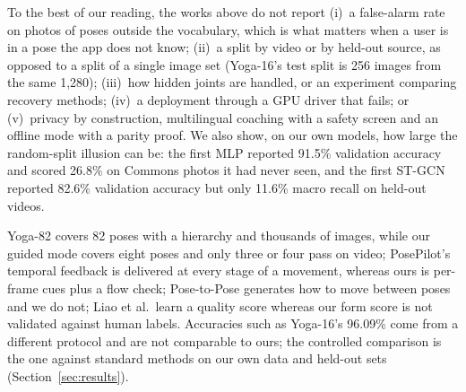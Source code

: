  To the best of our reading, the works above do not report (i)~a false-alarm rate on photos of poses outside the vocabulary, which is what matters when a user is in a pose the app does not know; (ii)~a split by video or by held-out source, as opposed to a split of a single image set (Yoga-16's test split is 256 images from the same 1{,}280); (iii)~how hidden joints are handled, or an experiment comparing recovery methods; (iv)~a deployment through a GPU driver that fails; or (v)~privacy by construction, multilingual coaching with a safety screen and an offline mode with a parity proof. We also show, on our own models, how large the random-split illusion can be: the first MLP reported 91.5\% validation accuracy and scored 26.8\% on Commons photos it had never seen, and the first ST-GCN reported 82.6\% validation accuracy but only 11.6\% macro recall on held-out videos.

 Yoga-82 covers 82 poses with a hierarchy and thousands of images, while our guided mode covers eight poses and only three or four pass on video; PosePilot's temporal feedback is delivered at every stage of a movement, whereas ours is per-frame cues plus a flow check; Pose-to-Pose generates how to move between poses and we do not; Liao et al.\ learn a quality score whereas our form score is not validated against human labels. Accuracies such as Yoga-16's 96.09\% come from a different protocol and are not comparable to ours; the controlled comparison is the one against standard methods on our own data and held-out sets (Section~\ref{sec:results}).
